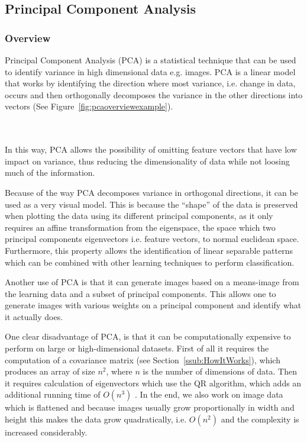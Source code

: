 \subsection{Principal Component Analysis}
\label{sub:PCA}
\subsubsection{Overview}
\label{ssub:PCAOverview}
Principal Component Analysis (PCA) is a statistical technique that can be used to identify variance in high dimensional data e.g. images.
PCA is a linear model that works by identifying the direction where most variance, i.e. change in data,
occurs and then orthogonally decomposes the variance in the other directions into vectors (See Figure~\ref{fig:pcaoverviewexample}).\\

\begin{minipage}{\linewidth}
\centering
{}
\label{fig:pcaoverviewexample}
\end{minipage}\\\\

In this way, PCA allows the possibility of omitting feature vectors that have low impact on variance,
thus reducing the dimensionality of data while not loosing much of the information.

Because of the way PCA decomposes variance in orthogonal directions, it can be used as a very visual model. 
This is because the ``shape'' of the data is preserved when plotting the data using its different principal components, 
as it only requires an affine transformation from the eigenspace, the space which two principal components eigenvectors i.e. feature vectors,
to normal euclidean space.
Furthermore, this property allows the identification of linear separable patterns which can be combined with other learning techniques to
perform classification.

Another use of PCA is that it can generate images based on a means-image from the learning data and a subset of principal components.
This allows one to generate images with various weights on a principal component and identify what it actually does.

One clear disadvantage of PCA, is that it can be computationally expensive to perform on large or high-dimensional datasets.
First of all it requires the computation of a covariance matrix (see Section~\ref{ssub:HowItWorks}), which produces an array of size $n^2$, where
$n$ is the number of dimensions of data.
Then it requires calculation of eigenvectors which use the QR algorithm, which adds an additional running time of $\mathit{O}(n^3)$ \cite{abenz2012qralgorithm}.
In the end, we also work on image data which is flattened and because images usually grow proportionally in width and height this makes the data grow quadratically, i.e. $\mathit{O}(n^2)$
and the complexity is increased considerably.

